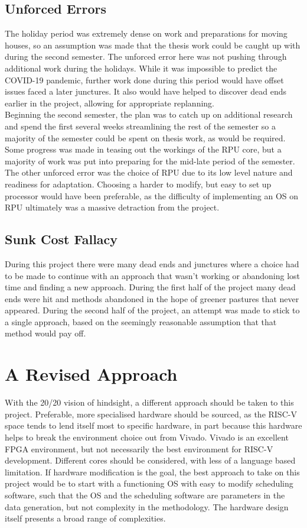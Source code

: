 		
	\subsection{Unforced Errors}
		The holiday period was extremely dense on work and preparations for moving houses, so an assumption was made that the thesis work could be caught up with during the second semester. The unforced error here was not pushing through additional work during the holidays. While it was impossible to predict the COVID-19 pandemic, further work done during this period would have offset issues faced a later junctures. It also would have helped to discover dead ends earlier in the project, allowing for appropriate replanning.\\
		Beginning the second semester, the plan was to catch up on additional research and spend the first several weeks streamlining the rest of the semester so a majority of the semester could be spent on thesis work, as would be required. Some progress was made in teasing out the workings of the RPU core, but a majority of work was put into preparing for the mid-late period of the semester.\\
		The other unforced error was the choice of RPU due to its low level nature and readiness for adaptation. Choosing a harder to modify, but easy to set up processor would have been preferable, as the difficulty of implementing an OS on RPU ultimately was a massive detraction from the project.
		
	\subsection{Sunk Cost Fallacy}
		During this project there were many dead ends and junctures where a choice had to be made to continue with an approach that wasn't working or abandoning lost time and finding a new approach. During the first half of the project many dead ends were hit and methods abandoned in the hope of greener pastures that never appeared. During the second half of the project, an attempt was made to stick to a single approach, based on the seemingly reasonable assumption that that method would pay off.
	

	
\section{A Revised Approach}
	With the 20/20 vision of hindsight, a different approach should be taken to this project. Preferable, more specialised hardware should be sourced, as the RISC-V space tends to lend itself most to specific hardware, in part because this hardware helps to break the environment choice out from Vivado. Vivado is an excellent FPGA environment, but not necessarily the best environment for RISC-V development. Different cores should be considered, with less of a language based limitation. If hardware modification is the goal, the best approach to take on this project would be to start with a functioning OS with easy to modify scheduling software, such that the OS and the scheduling software are parameters in the data generation, but not complexity in the methodology. The hardware design itself presents a broad range of complexities.
	

